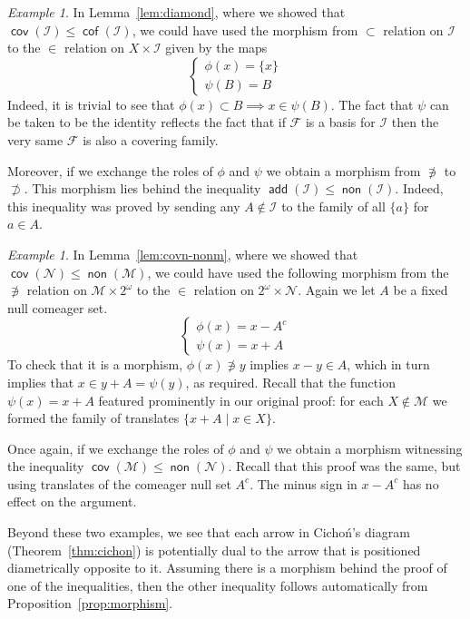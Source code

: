 \documentclass[11pt,oneside]{amsbook}
\newcommand{\Null}{\mathcal N}
\newcommand{\Meager}{\mathcal M}
\DeclareMathOperator{\add}{\mathsf{add}}
\DeclareMathOperator{\non}{\mathsf{non}}
\DeclareMathOperator{\cov}{\mathsf{cov}}
\DeclareMathOperator{\cof}{\mathsf{cof}}
\theoremstyle{definition}
\theoremstyle{plain}
\theoremstyle{definition}
\theoremstyle{remark}
\newtheorem{example}[thm]{Example}
\begin{document}
\begin{example}
  In Lemma~\ref{lem:diamond}, where we showed that $\cov(\mathcal I)\leq\cof(\mathcal I)$, we could have used the morphism from $\subset$ relation on $\mathcal I$ to the $\in$ relation on $X\times\mathcal I$ given by the maps
  \[\begin{cases}\phi(x)=\{x\}\\\psi(B)=B\end{cases}
  \]
  Indeed, it is trivial to see that $\phi(x)\subset B\implies x\in\psi(B)$. The fact that $\psi$ can be taken to be the identity reflects the fact that if $\mathcal F$ is a basis for $\mathcal I$ then the very same $\mathcal F$ is also a covering family.

  Moreover, if we exchange the roles of $\phi$ and $\psi$ we obtain a morphism from $\not\ni$ to $\not\supset$. This morphism lies behind the inequality $\add(\mathcal I)\leq\non(\mathcal I)$. Indeed, this inequality was proved by sending any $A\notin\mathcal I$ to the family of all $\{a\}$ for $a\in A$.
\end{example}

\begin{example}
  In Lemma~\ref{lem:covn-nonm}, where we showed that $\cov(\Null)\leq\non(\Meager)$, we could have used the following morphism from the $\not\ni$ relation on $\Meager\times2^\omega$ to the $\in$ relation on $2^\omega\times\Null$. Again we let $A$ be a fixed null comeager set.
  \[\begin{cases}\phi(x)=x-A^c\\\psi(x)=x+A\end{cases}
  \]
  To check that it is a morphism, $\phi(x)\not\ni y$ implies $x-y\in A$, which in turn implies that $x\in y+A=\psi(y)$, as required. Recall that the function $\psi(x)=x+A$ featured prominently in our original proof: for each $X\notin\Meager$ we formed the family of translates $\{x+A\mid x\in X\}$.
  
  Once again, if we exchange the roles of $\phi$ and $\psi$ we obtain a morphism witnessing the inequality $\cov(\Meager)\leq\non(\Null)$. Recall that this proof was the same, but using translates of the comeager null set $A^c$. The minus sign in $x-A^c$ has no effect on the argument.
\end{example}

Beyond these two examples, we see that each arrow in Cicho\'n's diagram (Theorem~\ref{thm:cichon}) is potentially dual to the arrow that is positioned diametrically opposite to it. Assuming there is a morphism behind the proof of one of the inequalities, then the other inequality follows automatically from Proposition~\ref{prop:morphism}.
\end{document}
